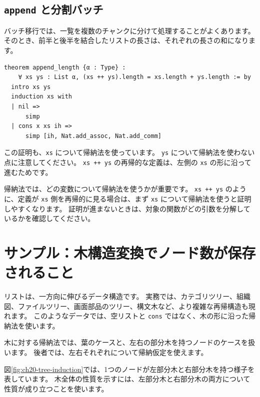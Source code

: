 \subsection{\texttt{append} と分割バッチ}

バッチ移行では、一覧を複数のチャンクに分けて処理することがよくあります。
そのとき、前半と後半を結合したリストの長さは、それぞれの長さの和になります。

\begin{listing}[htbp]
\begin{verbatim}
theorem append_length {α : Type} :
    ∀ xs ys : List α, (xs ++ ys).length = xs.length + ys.length := by
  intro xs ys
  induction xs with
  | nil =>
      simp
  | cons x xs ih =>
      simp [ih, Nat.add_assoc, Nat.add_comm]
\end{verbatim}
\caption{\texttt{append\_length}}
\label{lst:induction-append-length}
\end{listing}

この証明も、\texttt{xs} について帰納法を使っています。
\texttt{ys} について帰納法を使わない点に注意してください。
\texttt{xs ++ ys} の再帰的な定義は、左側の \texttt{xs} の形に沿って進むためです。

帰納法では、どの変数について帰納法を使うかが重要です。
\texttt{xs ++ ys} のように、定義が \texttt{xs} 側を再帰的に見る場合は、まず \texttt{xs} について帰納法を使うと証明しやすくなります。
証明が進まないときは、対象の関数がどの引数を分解しているかを確認してください。

\section{サンプル：木構造変換でノード数が保存されること}

リストは、一方向に伸びるデータ構造です。
実務では、カテゴリツリー、組織図、ファイルツリー、画面部品のツリー、構文木など、より複雑な再帰構造も現れます。
このようなデータでは、空リストと \texttt{cons} ではなく、木の形に沿った帰納法を使います。

木に対する帰納法では、葉のケースと、左右の部分木を持つノードのケースを扱います。
後者では、左右それぞれについて帰納仮定を使えます。


図\ref{fig:ch20-tree-induction}では、1つのノードが左部分木と右部分木を持つ様子を表しています。
木全体の性質を示すには、左部分木と右部分木の両方について性質が成り立つことを使います。

